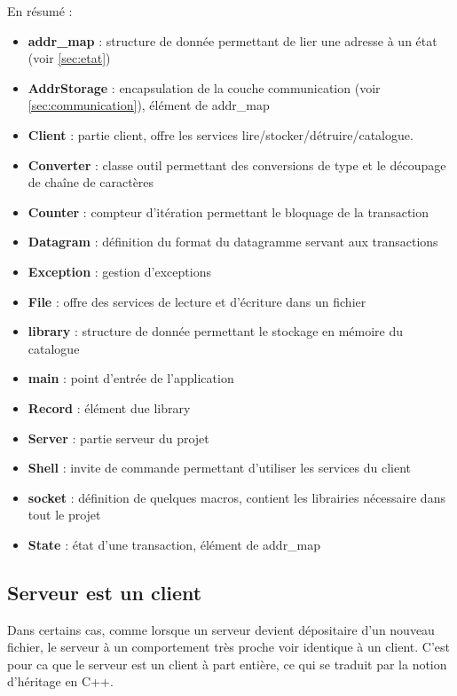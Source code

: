 \documentclass[10pt,a4paper]{article}
\begin{document}
En résumé :
\begin{itemize}
 \item \textbf{addr\_map} : structure de donnée permettant de lier une adresse à un état (voir \ref{sec:etat})
 \item \textbf{AddrStorage} : encapsulation de la couche communication (voir \ref{sec:communication}), élément de addr\_map
 \item \textbf{Client} : partie client, offre les services lire/stocker/détruire/catalogue.
 \item \textbf{Converter} : classe outil permettant des conversions de type et le découpage de chaîne de caractères
 \item \textbf{Counter} : compteur d'itération permettant le bloquage de la transaction
 \item \textbf{Datagram} : définition du format du datagramme servant aux transactions
 \item \textbf{Exception} : gestion d'exceptions
 \item \textbf{File} : offre des services de lecture et d'écriture dans un fichier
 \item \textbf{library} : structure de donnée permettant le stockage en mémoire du catalogue
 \item \textbf{main} : point d'entrée de l'application
 \item \textbf{Record} : élément due library
 \item \textbf{Server} : partie serveur du projet
 \item \textbf{Shell} : invite de commande permettant d'utiliser les services du client
 \item \textbf{socket} : définition de quelques macros, contient les librairies nécessaire dans tout le projet
 \item \textbf{State} : état d'une transaction, élément de addr\_map
\end{itemize}

\subsection{Serveur est un client}
Dans certains cas, comme lorsque un serveur devient dépositaire d'un nouveau fichier, le serveur à un comportement très proche voir identique à un client. C'est pour ca que le serveur est un client à part entière, ce qui se traduit par la notion d'héritage en C++.
\end{document}
